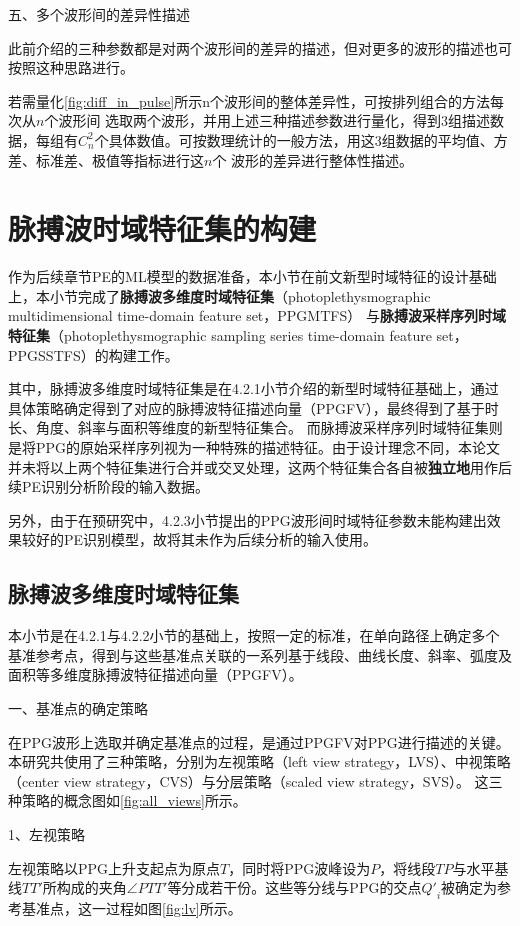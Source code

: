 五、多个波形间的差异性描述

此前介绍的三种参数都是对两个波形间的差异的描述，但对更多的波形的描述也可按照这种思路进行。

若需量化\autoref{fig:diff_in_pulse}所示n个波形间的整体差异性，可按排列组合的方法每次从$n$个波形间
选取两个波形，并用上述三种描述参数进行量化，得到3组描述数据，每组有$C_n^2$个具体数值。可按数理统计的一般方法，用这3组数据的平均值、方差、标准差、极值等指标进行这$n$个
波形的差异进行整体性描述。

\section{脉搏波时域特征集的构建}
作为后续章节PE的ML模型的数据准备，本小节在前文新型时域特征的设计基础上，本小节完成了\textbf{脉搏波多维度时域特征集}（photoplethysmographic multidimensional time-domain feature set，PPGMTFS）
与\textbf{脉搏波采样序列时域特征集}（photoplethysmographic sampling series time-domain feature set，PPGSSTFS）的构建工作。

其中，脉搏波多维度时域特征集是在4.2.1小节介绍的新型时域特征基础上，通过具体策略确定得到了对应的脉搏波特征描述向量（PPGFV），最终得到了基于时长、角度、斜率与面积等维度的新型特征集合。
而脉搏波采样序列时域特征集则是将PPG的原始采样序列视为一种特殊的描述特征。由于设计理念不同，本论文并未将以上两个特征集进行合并或交叉处理，这两个特征集合各自被\textbf{独立地}用作后续PE识别分析阶段的输入数据。

另外，由于在预研究中，4.2.3小节提出的PPG波形间时域特征参数未能构建出效果较好的PE识别模型，故将其未作为后续分析的输入使用。

\subsection{脉搏波多维度时域特征集}

本小节是在4.2.1与4.2.2小节的基础上，按照一定的标准，在单向路径上确定多个基准参考点，得到与这些基准点关联的一系列基于线段、曲线长度、斜率、弧度及面积等多维度脉搏波特征描述向量（PPGFV）。

一、基准点的确定策略

在PPG波形上选取并确定基准点的过程，是通过PPGFV对PPG进行描述的关键。本研究共使用了三种策略，分别为左视策略（left view strategy，LVS）、中视策略（center view strategy，CVS）与分层策略（scaled view strategy，SVS）。
这三种策略的概念图如\autoref{fig:all_views}所示。

1、左视策略

左视策略以PPG上升支起点为原点$T$，同时将PPG波峰设为$P$，将线段$TP$与水平基线$TT'$所构成的夹角$\angle PTT'$等分成若干份。这些等分线与PPG的交点${Q'}_i$被确定为参考基准点，这一过程如图\autoref{fig:lv}所示。

